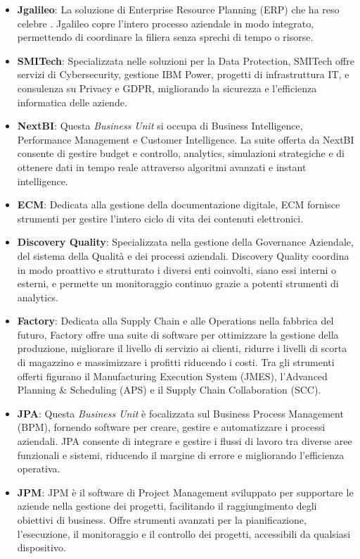 \begin{itemize}
    \item \textbf{Jgalileo}: La soluzione di Enterprise Resource Planning (ERP) che ha reso celebre \myCompany. Jgalileo copre l'intero processo aziendale in modo integrato, permettendo di coordinare la filiera senza sprechi di tempo o risorse.
    \item \textbf{SMITech}: Specializzata nelle soluzioni per la Data Protection, SMITech offre servizi di Cybersecurity, gestione IBM Power, progetti di infrastruttura IT, e consulenza su Privacy e GDPR, migliorando la sicurezza e l'efficienza informatica delle aziende.
    \item \textbf{NextBI}: Questa \emph{Business Unit} si occupa di Business Intelligence, Performance Management e Customer Intelligence. La suite offerta da NextBI consente di gestire budget e controllo, analytics, simulazioni strategiche e di ottenere dati in tempo reale attraverso algoritmi avanzati e instant intelligence.
    \item \textbf{ECM}: Dedicata alla gestione della documentazione digitale, ECM fornisce strumenti per gestire l'intero ciclo di vita dei contenuti elettronici.
    \item \textbf{Discovery Quality}: Specializzata nella gestione della Governance Aziendale, del sistema della Qualità e dei processi aziendali. Discovery Quality coordina in modo proattivo e strutturato i diversi enti coinvolti, siano essi interni o esterni, e permette un monitoraggio continuo grazie a potenti strumenti di analytics.
    \item \textbf{Factory}: Dedicata alla Supply Chain e alle Operations nella fabbrica del futuro, Factory offre una suite di software per ottimizzare la gestione della produzione, migliorare il livello di servizio ai clienti, ridurre i livelli di scorta di magazzino e massimizzare i profitti riducendo i costi. Tra gli strumenti offerti figurano il Manufacturing Execution System (JMES), l'Advanced Planning \& Scheduling (APS) e il Supply Chain Collaboration (SCC).
    \item \textbf{JPA}: Questa \emph{Business Unit} è focalizzata sul Business Process Management (BPM), fornendo software per creare, gestire e automatizzare i processi aziendali. JPA consente di integrare e gestire i flussi di lavoro tra diverse aree funzionali e sistemi, riducendo il margine di errore e migliorando l'efficienza operativa.
    \item \textbf{JPM}: JPM è il software di Project Management sviluppato per supportare le aziende nella gestione dei progetti, facilitando il raggiungimento degli obiettivi di business. Offre strumenti avanzati per la pianificazione, l'esecuzione, il monitoraggio e il controllo dei progetti, accessibili da qualsiasi dispositivo.

\end{itemize}
